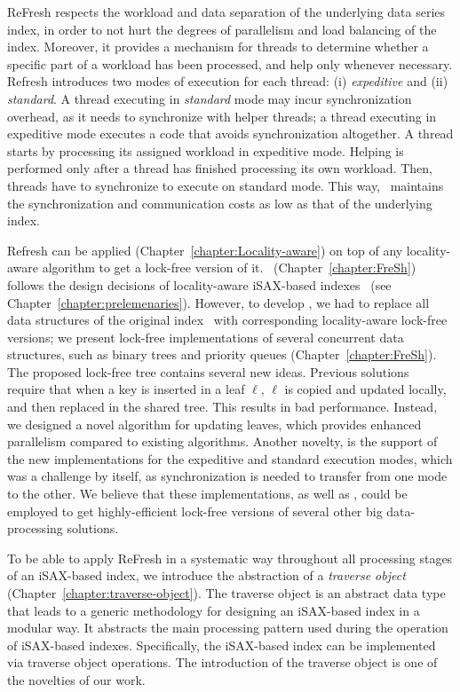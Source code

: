 ReFresh respects the workload and data separation of the underlying data series index, 
in order to not hurt the degrees of parallelism and load balancing of the index.
Moreover, it provides a mechanism for threads to determine whether a specific part
of a workload has been processed, and help only whenever necessary.
Refresh introduces two modes of execution for each thread: 
(i) {\em expeditive} and (ii) {\em standard}.
%
A thread executing in {\em standard} mode may incur synchronization overhead,
as it needs to synchronize with helper threads; a thread executing in {expeditive}
mode executes a code that avoids synchronization altogether. 
A thread starts by processing its assigned workload in expeditive mode. 
Helping is performed only after a thread has finished processing its own workload.
Then, threads have to synchronize to execute on standard mode. 
This way, \Refresh\ maintains the synchronization and communication costs as low as
that of the underlying index.

Refresh can be applied (Chapter~\ref{chapter:Locality-aware}) on top of any locality-aware
algorithm to get a lock-free version of it. 
\Fresh\ (Chapter~\ref{chapter:FreSh}) follows the design decisions of locality-aware
iSAX-based indexes~\cite{isaxfamily,PFP21-I} (see Chapter~\ref{chapter:prelemenaries}).
However, to develop \Fresh, we had to replace all data structures 
of the original index~\cite{PFP21-I} with corresponding locality-aware lock-free versions;
we present lock-free implementations of several concurrent data structures, such as  
binary trees and priority queues (Chapter~\ref{chapter:FreSh}).
The proposed lock-free tree contains several new ideas. 
Previous solutions~\cite{EFRB10,DBLP:conf/podc/EllenFHR13,FR2018,NRM20} require that
when a key is inserted in a leaf $\mathit{\ell}$, 
$\mathit{\ell}$ is copied and updated locally, and then
replaced in the shared tree. This results in bad performance. 
Instead, we designed a novel algorithm for updating leaves, 
which provides enhanced parallelism compared to existing algorithms.
Another novelty, is the support of the new implementations for the expeditive and standard
execution modes, which was a challenge by itself, as synchronization is
needed to transfer from one mode to the other.
We believe that these implementations, as well as \Refresh, could be employed to get
highly-efficient lock-free versions of several other big data-processing solutions.

To be able to apply ReFresh in a systematic way throughout all processing stages of an
iSAX-based index, we introduce the abstraction of a {\em traverse object}
(Chapter~\ref{chapter:traverse-object}). The traverse object is an abstract data type that
leads to a generic methodology for designing an iSAX-based index in a modular way. It abstracts
the main processing pattern used during the operation of iSAX-based indexes.
Specifically, the iSAX-based index can be implemented via traverse object operations.
The introduction of the traverse object is one of the novelties of our work.

